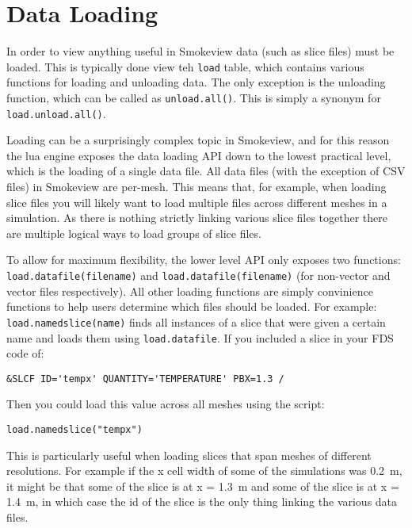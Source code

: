 \documentclass[11pt,twoside]{book}
\begin{document}
\section{Data Loading}

In order to view anything useful in Smokeview data (such as slice files) must be
loaded. This is typically done view teh \lstinline{load} table, which contains
various functions for loading and unloading data. The only exception is the
unloading function, which can be called as \lstinline{unload.all()}. This is
simply a synonym for \lstinline{load.unload.all()}.

Loading can be a surprisingly complex topic in Smokeview, and for this reason the lua engine exposes the data loading API down to the lowest practical level, which is the loading of a single data file. All data files (with the exception of CSV files) in Smokeview are per-mesh. This means that, for example, when loading slice files you will likely want to load multiple files across different meshes in a simulation. As there is nothing strictly linking various slice files together there are multiple logical ways to load groups of slice files.

To allow for maximum flexibility, the lower level API only exposes two
functions: \lstinline{load.datafile(filename)} and
\lstinline{load.datafile(filename)} (for non-vector and vector files
respectively). All other loading functions are simply convinience functions to
help users determine which files should be loaded. For example:
\lstinline{load.namedslice(name)} finds all instances of a slice that were given
a certain name and loads them using \lstinline{load.datafile}. If you included a slice in your FDS code of:

\begin{lstlisting}[style=lua]
&SLCF ID='tempx' QUANTITY='TEMPERATURE' PBX=1.3 /
\end{lstlisting}

Then you could load this value across all meshes using the script:

\begin{lstlisting}[style=lua]
load.namedslice("tempx")
\end{lstlisting}

This is particularly useful when loading slices that span meshes of different
resolutions. For example if the x cell width of some of the simulations was
0.2~m, it might be that some of the slice is at x = 1.3~m and some of the slice
is at x = 1.4~m, in which case the id of the slice is the only thing linking the
various data files.
\end{document}
